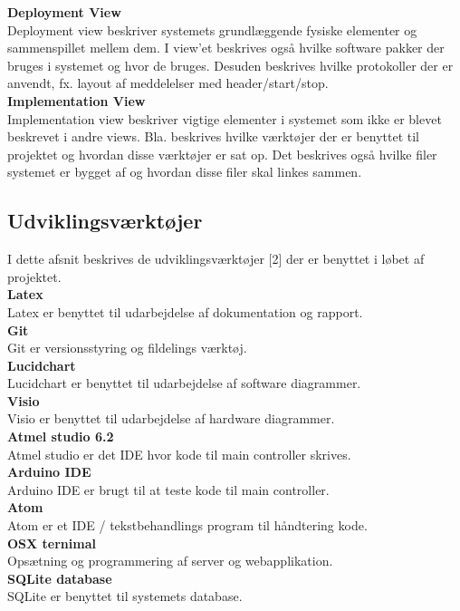 \textbf{Deployment View}\\
Deployment view beskriver systemets grundlæggende fysiske elementer og sammenspillet mellem dem. I view'et beskrives også hvilke software pakker der bruges i systemet og hvor de bruges. Desuden beskrives hvilke protokoller der er anvendt, fx. layout af meddelelser med header/start/stop.\\


\textbf{Implementation View}\\
Implementation view beskriver vigtige elementer i systemet som ikke er blevet beskrevet i andre views. Bla. beskrives hvilke værktøjer der er benyttet til projektet og hvordan disse værktøjer er sat op. Det beskrives også hvilke filer systemet er bygget af og hvordan disse filer skal linkes sammen.


\newpage
\subsection{Udviklingsværktøjer}
I dette afsnit beskrives de udviklingsværktøjer [2] der er benyttet i løbet af projektet. \\

\textbf{Latex}\\
Latex er benyttet til udarbejdelse af dokumentation og rapport. \\


\textbf{Git}\\
Git er versionsstyring og fildelings værktøj.\\


\textbf{Lucidchart}\\
Lucidchart er benyttet til udarbejdelse af software diagrammer. \\

\textbf{Visio}\\
Visio er benyttet til udarbejdelse af hardware diagrammer. \\

\textbf{Atmel studio 6.2}\\
Atmel studio er det IDE hvor kode til main controller skrives. \\

\textbf{Arduino IDE}\\
Arduino IDE er brugt til at teste kode til main controller. \\

\textbf{Atom}\\
Atom er et IDE / tekstbehandlings program til håndtering kode. \\

\textbf{OSX ternimal}\\
Opsætning og programmering af server og webapplikation.  \\

\textbf{SQLite database}\\
SQLite er benyttet til systemets database.